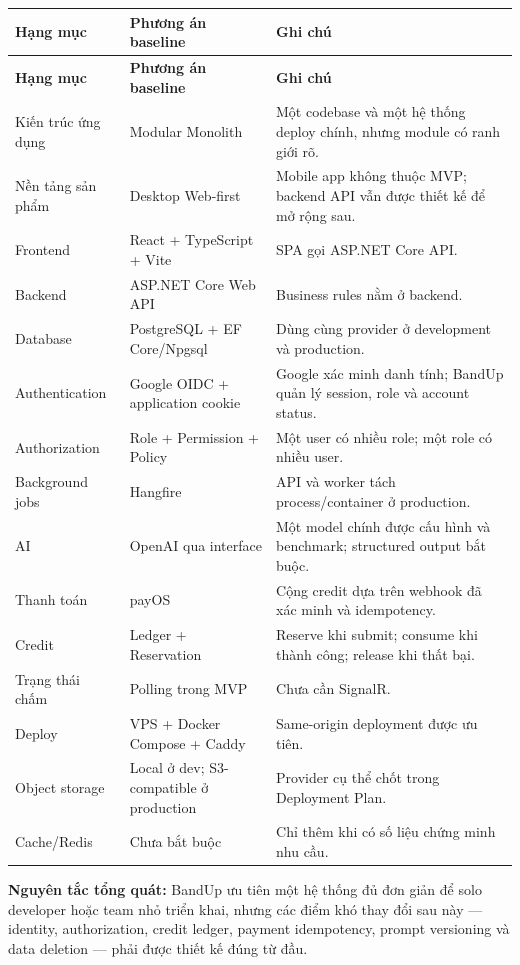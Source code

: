 \documentclass[11pt,a4paper]{article}
\begin{document}
\begin{longtable}{|P{0.27\textwidth}|P{0.29\textwidth}|P{0.34\textwidth}|}
\hline
\textbf{Hạng mục} & \textbf{Phương án baseline} & \textbf{Ghi chú} \\ \hline
\endfirsthead
\hline
\textbf{Hạng mục} & \textbf{Phương án baseline} & \textbf{Ghi chú} \\ \hline
\endhead
Kiến trúc ứng dụng & Modular Monolith & Một codebase và một hệ thống deploy chính, nhưng module có ranh giới rõ. \\ \hline
Nền tảng sản phẩm & Desktop Web-first & Mobile app không thuộc MVP; backend API vẫn được thiết kế để mở rộng sau. \\ \hline
Frontend & React + TypeScript + Vite & SPA gọi ASP.NET Core API. \\ \hline
Backend & ASP.NET Core Web API & Business rules nằm ở backend. \\ \hline
Database & PostgreSQL + EF Core/Npgsql & Dùng cùng provider ở development và production. \\ \hline
Authentication & Google OIDC + application cookie & Google xác minh danh tính; BandUp quản lý session, role và account status. \\ \hline
Authorization & Role + Permission + Policy & Một user có nhiều role; một role có nhiều user. \\ \hline
Background jobs & Hangfire & API và worker tách process/container ở production. \\ \hline
AI & OpenAI qua interface & Một model chính được cấu hình và benchmark; structured output bắt buộc. \\ \hline
Thanh toán & payOS & Cộng credit dựa trên webhook đã xác minh và idempotency. \\ \hline
Credit & Ledger + Reservation & Reserve khi submit; consume khi thành công; release khi thất bại. \\ \hline
Trạng thái chấm & Polling trong MVP & Chưa cần SignalR. \\ \hline
Deploy & VPS + Docker Compose + Caddy & Same-origin deployment được ưu tiên. \\ \hline
Object storage & Local ở dev; S3-compatible ở production & Provider cụ thể chốt trong Deployment Plan. \\ \hline
Cache/Redis & Chưa bắt buộc & Chỉ thêm khi có số liệu chứng minh nhu cầu. \\ \hline
\end{longtable}

\begin{decisionbox}
\textbf{Nguyên tắc tổng quát:} BandUp ưu tiên một hệ thống đủ đơn giản để solo developer hoặc team nhỏ triển khai, nhưng các điểm khó thay đổi sau này --- identity, authorization, credit ledger, payment idempotency, prompt versioning và data deletion --- phải được thiết kế đúng từ đầu.
\end{decisionbox}
\end{document}
